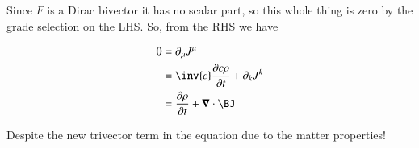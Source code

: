 Since $F$ is a Dirac bivector it has no scalar part, so this whole thing is zero by the grade selection on the LHS.  So, from the RHS we have

\begin{align*}
0 &= \partial_\mu J^\mu \\
&= \inv{c} \PD{t}{c\rho} + \partial_k J^k \\
&= \PD{t}{\rho} + \spacegrad \cdot \BJ
\end{align*}

Despite the new trivector term in the equation due to the matter properties!
